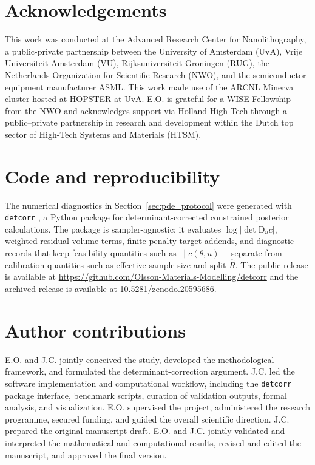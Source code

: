 \documentclass[11pt]{article}
\newcommand{\D}{\mathrm{D}}
\newcommand{\abs}[1]{\left\lvert #1\right\rvert}
\newcommand{\norm}[1]{\left\lVert #1\right\rVert}
\newcommand{\detcorr}{\texttt{detcorr}}
\begin{document}
\section*{Acknowledgements}
This work was conducted at the Advanced Research Center for Nanolithography, a public-private partnership between the University of Amsterdam (UvA), Vrije Universiteit Amsterdam (VU), Rijksuniversiteit Groningen (RUG), the Netherlands Organization for Scientific Research (NWO), and the semiconductor equipment manufacturer ASML. This work made use of the ARCNL Minerva cluster hosted at HOPSTER at UvA. E.O. is grateful for a WISE Fellowship from the NWO and acknowledges support via Holland High Tech through a public--private partnership in research and development within the Dutch top sector of High-Tech Systems and Materials (HTSM).

\section*{Code and reproducibility}
\label{sec:code_reproducibility}

The numerical diagnostics in Section~\ref{sec:pde_protocol} were generated with \detcorr{} \cite{DetcorrSoftware2026}, a Python package for determinant-corrected constrained posterior calculations. The package is sampler-agnostic: it evaluates \(\log\abs{\det \D_u c}\), weighted-residual volume terms, finite-penalty target addends, and diagnostic records that keep feasibility quantities such as \(\norm{c(\theta,u)}\) separate from calibration quantities such as effective sample size and split-\(\hat R\). The public release is available at \url{https://github.com/Olsson-Materials-Modelling/detcorr} and the archived release is available at \url{10.5281/zenodo.20595686}.

\section*{Author contributions}
\label{sec:author_contributions}

E.O. and J.C. jointly conceived the study, developed the methodological framework, and formulated the determinant-correction argument. J.C. led the software implementation and computational workflow, including the \detcorr{} package interface, benchmark scripts, curation of validation outputs, formal analysis, and visualization. E.O. supervised the project, administered the research programme, secured funding, and guided the overall scientific direction. J.C. prepared the original manuscript draft. E.O. and J.C. jointly validated and interpreted the mathematical and computational results, revised and edited the manuscript, and approved the final version.
\end{document}
